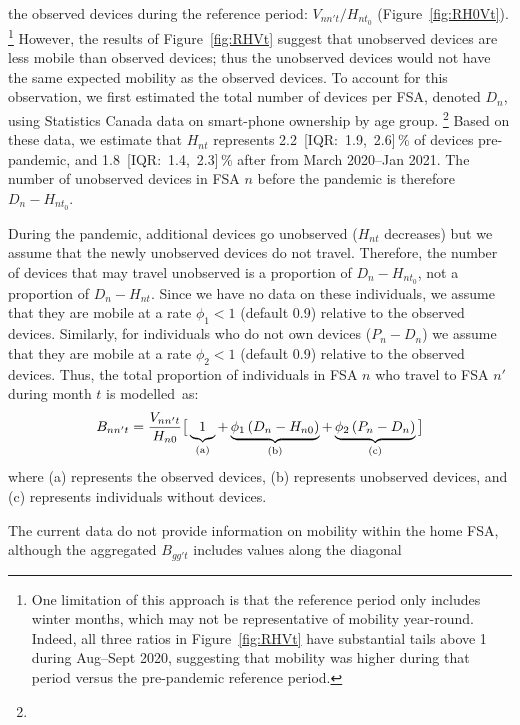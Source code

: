 the observed devices during the reference period: $V_{nn't} / H_{nt_0}$ (Figure~\ref{fig:RH0Vt}).%
\footnote{One limitation of this approach is that the reference period only includes winter months,
  which may not be representative of mobility year-round.
  Indeed, all three ratios in Figure~\ref{fig:RHVt} have substantial tails above 1 during Aug--Sept 2020,
  suggesting that mobility was higher during that period versus the pre-pandemic reference period.}
However, the results of Figure~\ref{fig:RHVt} suggest that unobserved devices are less mobile than observed devices;
thus the unobserved devices would not have the same expected mobility as the observed devices.
To account for this observation, we first estimated the total number of devices per FSA, denoted $D_n$,
using Statistics Canada data on smart-phone ownership by age group.%
\footnote{}
Based on these data, we estimate that $H_{nt}$ represents
2.2~[IQR:~1.9,~2.6]\,\% of devices pre-pandemic, and
1.8~[IQR:~1.4,~2.3]\,\% after from March 2020--Jan 2021.
The number of unobserved devices in FSA $n$ before the pandemic is therefore $D_n - H_{nt_0}$.
\par
During the pandemic, additional devices go unobserved ($H_{nt}$ decreases)
but we assume that the newly unobserved devices do not travel.
Therefore, the number of devices that may travel unobserved
is a proportion of $D_n - H_{nt_0}$, not a proportion of $D_n - H_{nt}$.
Since we have no data on these individuals, we assume that they are mobile
at a rate $\phi_1 < 1$ (default 0.9) relative to the observed devices.
Similarly, for individuals who do not own devices ($P_n - D_n$) we assume that they are mobile
at a rate $\phi_2 < 1$ (default 0.9) relative to the observed devices.
Thus, the total proportion of individuals in FSA $n$ who travel to FSA $n'$ during month $t$ is modelled~as:
\begin{equation}\label{eq:Bnnt}
  B_{nn't} = \frac{V_{nn't}}{H_{n0}} \big[
  \underbrace{1\vphantom{\phi}}_{\textrm{(a)}}
  + \underbrace{\phi_1 \left(D_n - H_{n0}\right)}_{\textrm{(b)}}
  + \underbrace{\phi_2 \left(P_n - D_n\right)}_{\textrm{(c)}} \big]
\end{equation}
where (a) represents the observed devices,
(b) represents unobserved devices, and
(c) represents individuals without devices.
\par
The current data do not provide information on mobility within the home FSA,
although the aggregated $B_{gg't}$ includes values along the diagonal
